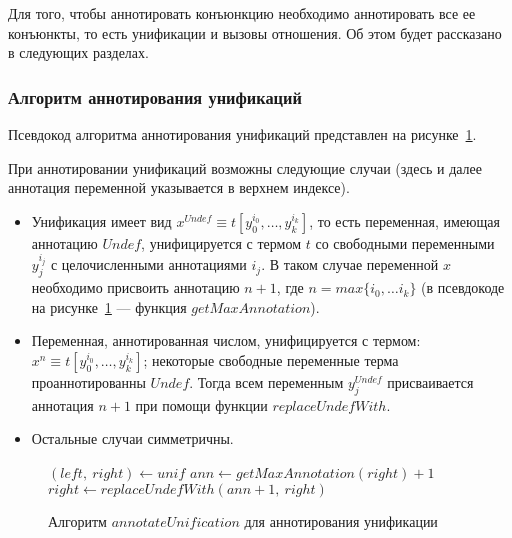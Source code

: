 Для того, чтобы аннотировать конъюнкцию необходимо аннотировать все ее конъюнкты, то есть унификации и вызовы отношения. 
Об этом будет рассказано в следующих разделах. 

\subsubsection{Алгоритм аннотирования унификаций}

Псевдокод алгоритма аннотирования унификаций представлен на рисунке~\ref{alg:annotateUnification}.

При аннотировании унификаций возможны следующие случаи (здесь и далее аннотация переменной указывается в верхнем индексе).
\begin{itemize}
    \item Унификация имеет вид $x^{Undef} \equiv t[y_0^{i_0}, \dots, y_k^{i_k}]$, то есть переменная, имеющая аннотацию $Undef$, унифицируется с термом $t$ со свободными переменными $y_j^{i_j}$ с целочисленными аннотациями $i_j$. В таком случае переменной $x$ необходимо присвоить аннотацию $n + 1$, где $n = max \{ i_0, \dots i_k\}$ (в псевдокоде на рисунке~\ref{alg:annotateUnification} --- функция $getMaxAnnotation$).
    \item Переменная, аннотированная числом, унифицируется с термом: $x^{n} \equiv t[y_0^{i_0}, \dots, y_k^{i_k}]$; некоторые свободные переменные терма проаннотированны $Undef$.
    Тогда всем переменным $y_j^{Undef}$ присваивается аннотация $n+1$ при помощи функции $replaceUndefWith$.
    \item Остальные случаи симметричны.
\end{itemize}

\begin{figure}[h!]
  \begin{center}
  \begin{minipage}{1\textwidth}
\begin{algorithm}[H]
  $(left,~right) \gets unif$\;
   {
     {
      $ann \gets getMaxAnnotation(right) + 1$
    }
     {
      $right \gets replaceUndefWith(ann + 1,~right)$
    }
  }
\end{algorithm}
  \end{minipage}
  \end{center}
  \caption{Алгоритм $annotateUnification$ для аннотирования унификации}
  \label{alg:annotateUnification}
\end{figure}

